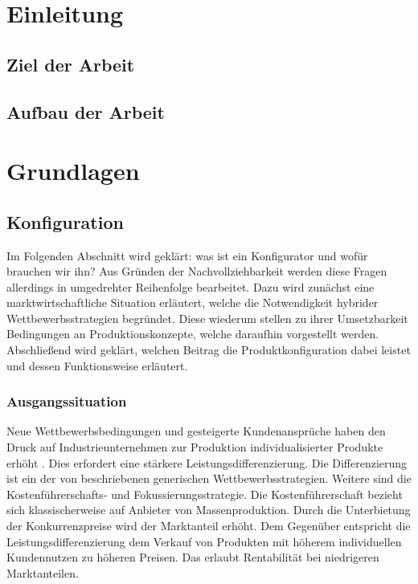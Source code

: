 \documentclass[12pt,a4paper,bibliography=totocnumbered,listof=totoc]{scrartcl}
\begin{document}













\section{Einleitung}

\subsection{Ziel der Arbeit}

\subsection{Aufbau der Arbeit}

\pagebreak

\section{Grundlagen}

\subsection{Konfiguration}
Im Folgenden Abschnitt wird geklärt: was ist ein Konfigurator und wofür brauchen wir ihn? Aus Gründen der Nachvollziehbarkeit werden diese Fragen allerdings in umgedrehter Reihenfolge bearbeitet.
Dazu wird zunächst eine marktwirtschaftliche Situation erläutert, welche die Notwendigkeit hybrider Wettbewerbsstrategien begründet. Diese wiederum stellen zu ihrer Umsetzbarkeit Bedingungen an Produktionskonzepte, welche daraufhin vorgestellt werden. Abschließend wird geklärt, welchen Beitrag die Produktkonfiguration dabei leistet und dessen Funktionsweise erläutert.

\subsubsection{Ausgangssituation}
 \label{subssubsection:Ausgangssituation}
Neue Wettbewerbsbedingungen und gesteigerte Kundenansprüche haben den Druck auf Industrieunternehmen zur Produktion individualisierter Produkte erhöht \citep{piller98}. Dies erfordert eine stärkere Leistungsdifferenzierung\citep{lutz11}. Die Differenzierung ist ein der von \citeauthor{porter02} beschriebenen \glqq generischen Wettbewerbsstrategien\grqq{}. Weitere sind die Kostenführerschafts- und Fokussierungsstrategie. Die Kostenführerschaft bezieht sich klassischerweise auf Anbieter von Massenproduktion. Durch die Unterbietung der Konkurrenzpreise wird der Marktanteil erhöht. Dem Gegenüber entspricht die Leistungsdifferenzierung dem Verkauf von Produkten mit höherem individuellen Kundennutzen zu höheren Preisen. Das erlaubt Rentabilität bei niedrigeren Marktanteilen.
\end{document}
